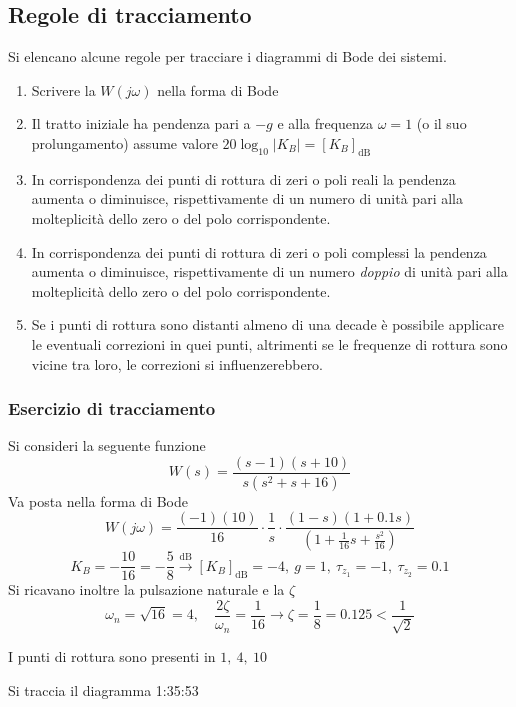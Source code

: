 \newpage
\subsection{Regole di tracciamento}
Si elencano alcune regole per tracciare i diagrammi di Bode dei sistemi.
\begin{enumerate}
\item Scrivere la $W(j\omega)$ nella forma di Bode
\item Il tratto iniziale ha pendenza pari a $-g$ e alla frequenza $\omega=1$ (o
il suo prolungamento) assume valore $20\log_{10}|K_B| = [K_B]_{\si{\deci\bel}}$
\item In corrispondenza dei punti di rottura di zeri o poli reali la pendenza
aumenta o diminuisce, rispettivamente di un numero di unità pari alla
molteplicità dello zero o del polo corrispondente.
\item In corrispondenza dei punti di rottura di zeri o poli complessi la
pendenza
aumenta o diminuisce, rispettivamente di un numero \textit{doppio} di unità
pari alla
molteplicità dello zero o del polo corrispondente.
\item Se i punti di rottura sono distanti almeno di una decade è possibile
applicare le eventuali correzioni in quei punti, altrimenti se le frequenze di
rottura sono vicine tra loro, le correzioni si influenzerebbero.
\end{enumerate}

\subsubsection{Esercizio di tracciamento}
Si consideri la seguente funzione
$$
W(s) = \frac{(s-1)(s+10)}{s(s^2+s+16)}
$$
Va posta nella forma di Bode
$$
W(j\omega) = \frac{(-1)(10)}{16} \cdot \frac{1}{s}\cdot \frac{(1-s)(1+0.1s)
}{\left( 1+\frac{1}{16}s + \frac{s^2}{16} \right)}
$$
$$
K_B = -\frac{10}{16} = -\frac{5}{8} \stackrel{\si{\deci\bel}}{\longrightarrow}
[K_B]_{\si{\deci\bel}} = -4,\ g=1,\ \tau_{z_1} = -1,\ \tau_{z_2} = 0.1
$$
Si ricavano inoltre la pulsazione naturale e la $\zeta$
$$
\omega_n = \sqrt{16} = 4,\quad \frac{2\zeta}{\omega_n} = \frac{1}{16}
\longrightarrow \zeta= \frac{1}{8} = 0.125 < \frac{1}{\sqrt{2}}
$$

I punti di rottura sono presenti in $1,\ 4,\ 10$

Si traccia il diagramma
1:35:53
